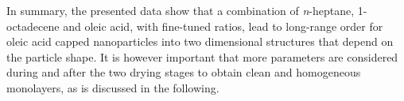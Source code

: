 \documentclass[\main/dresen_thesis.tex]{subfiles}
\begin{document}
  In summary, the presented data show that a combination of \textit{n}-heptane, 1-octadecene and oleic acid, with fine-tuned ratios, lead to long-range order for oleic acid capped nanoparticles into two dimensional structures that depend on the particle shape.
  It is however important that more parameters are considered during and after the two drying stages to obtain clean and homogeneous monolayers, as is discussed in the following.
\end{document}
